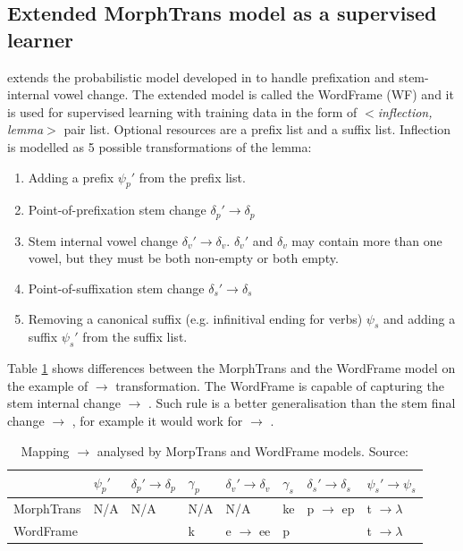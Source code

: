 \subsection{Extended MorphTrans model as a supervised learner}
\cite{wicentowski04} extends the probabilistic model developed in \citep{yarowsky00} to handle prefixation and stem-internal vowel change. The extended model is called the WordFrame (WF) and it is used for supervised learning with training data in the form of \emph{$<$inflection, lemma$>$} pair list. Optional resources are a prefix list and a suffix list. Inflection is modelled as 5 possible transformations of the lemma: 
\begin{enumerate}
\item Adding a prefix $\psi_p'$ from the prefix list.
\item Point-of-prefixation stem change $\delta_p' \rightarrow \delta_p$
\item Stem internal vowel change $\delta_v' \rightarrow \delta_v$. $\delta_v'$ and $\delta_v$ may contain more than one vowel, but they must be both non-empty or both empty.
\item Point-of-suffixation stem change $\delta_s' \rightarrow \delta_s$
\item Removing a canonical suffix (e.g. infinitival ending for verbs) $\psi_s$ and adding a suffix $\psi_s'$ from the suffix list.
\end{enumerate}

\noindent Table \ref{table:wordframe} shows differences between the MorphTrans and the WordFrame model on the example of  $\rightarrow$  transformation. The WordFrame is capable of capturing the stem internal change  $\rightarrow$ . Such rule is a better generalisation than the stem final change  $\rightarrow$ , for example it would work for  $\rightarrow$ .
\begin{table}[h]
\begin{center}
\begin{tabular}{llllllll}
\toprule
& $\psi_p'$    & $\delta_p' \rightarrow \delta_p$ & $\gamma_p$ & $\delta_v' \rightarrow \delta_v$ & $\gamma_s$ & $\delta_s' \rightarrow \delta_s$ & $\psi_s' \rightarrow \psi_s$     \\ 
\midrule
MorphTrans & N/A & N/A & N/A & N/A & ke & p $ \rightarrow$ ep & t $ \rightarrow \lambda$ \\
WordFrame & & & k &  e $\rightarrow$ ee & p &  & t $\rightarrow \lambda$\\
\bottomrule
\end{tabular}
\end{center}
\caption{\label{table:wordframe} Mapping  $\rightarrow$  analysed by MorpTrans and WordFrame models. Source: \cite{wicentowski04}}
\end{table}

